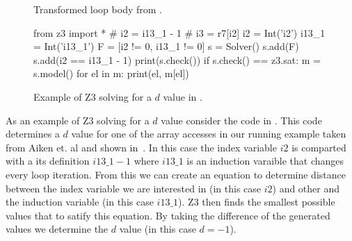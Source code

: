 \begin{figure}[h]
\centering
\begin{minipage}{0.7\textwidth}
\end{minipage}
\caption{Transformed loop body from .} 
\label{fig:transformedaikenexample}
\end{figure}

\begin{figure}[h]
\centering
\begin{minipage}{0.7\textwidth}
\begin{pythoncode}
from z3 import *
# i2 = i13_1 - 1
# i3 = r7[i2]
i2 = Int('i2')
i13_1 = Int('i13_1')
F = [i2 != 0, i13_1 != 0]
s = Solver()
s.add(F)
s.add(i2 == i13_1 - 1)
print(s.check())
if s.check() == z3.sat:
    m = s.model()
    for el in m:
        print(el, m[el])
\end{pythoncode}
\end{minipage}
\caption{Example of Z3 solving for a $d$ value in .}
\label{fig:z3example}
\end{figure}

As an example of Z3 solving for a $d$ value consider the code in .
This code determines a $d$ value for one of the array accesses in our running 
example taken from Aiken et. al \cite{Aiken1988} and shown in~. 
In this case the index variable $i2$ is comparted with a its definition $i13\_1 - 1$ where 
$i13\_1$ is an induction varaible that changes every loop iteration. From this we can create an equation to 
determine distance between the index variable we are interested in (in this case $i2$) and other 
and the induction variable (in this case $i13\_1$). Z3 then finds the smallest possible values that 
to satify this equation. By taking the difference of the generated values we determine the $d$ value (in
this case $d = -1$). 

